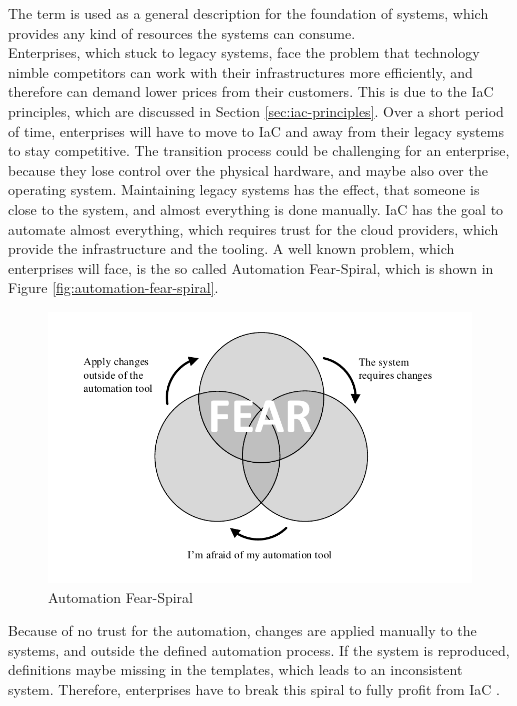 The term  is used as a general description for the foundation of systems, which provides any kind of resources the systems can consume. \\

Enterprises, which stuck to legacy systems, face the problem that technology nimble competitors can work with their infrastructures more efficiently, and therefore can demand lower prices from their customers. This is due to the IaC principles, which are discussed in Section \vref{sec:iac-principles}. Over a short period of time, enterprises will have to move to IaC and away from their legacy systems to stay competitive. The transition process could be challenging for an enterprise, because they lose control over the physical hardware, and maybe also over the operating system. Maintaining legacy systems has the effect, that someone is close to the system, and almost everything is done manually. IaC has the goal to automate almost everything, which requires trust for the cloud providers, which provide the infrastructure and the tooling. A well known problem, which enterprises will face, is the so called Automation Fear-Spiral, which is shown in Figure \vref{fig:automation-fear-spiral}.

\begin{figure}[htbp]
	\centering
	\includegraphics[scale=1]{images/automation-fear-spiral.pdf}
	\caption{Automation Fear-Spiral}
	\label{fig:automation-fear-spiral}
\end{figure} 

Because of no trust for the automation, changes are applied manually to the systems, and outside the defined automation process. If the system is reproduced, definitions maybe missing in the templates, which leads to an inconsistent system. Therefore, enterprises have to break this spiral to fully profit from IaC \cite{Morris2016}. \\

